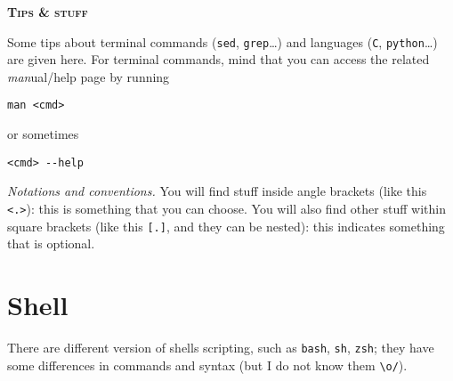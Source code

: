 \documentclass[a4paper,12pt,%
              final%
              ]{article}
\begin{document}
\begin{center}
\bfseries \scshape \Huge \color{BlueX}%
Tips \& stuff
\end{center}
%
\vspace*{\baselineskip}

Some tips about terminal commands (\texttt{sed}, \texttt{grep}\ldots) and languages (\texttt{C}, \texttt{python}\ldots) are given here. For terminal commands, mind that you can access the related \emph{man}ual/help page by running
\begin{verbatim}
man <cmd>
\end{verbatim}
or sometimes
\begin{verbatim}
<cmd> --help
\end{verbatim}

\emph{Notations and conventions.} You will find stuff inside angle brackets (like this \verb|<.>|): this is something that you can choose. You will also find other stuff within square brackets (like this \verb|[.]|, and they can be nested): this indicates something that is optional.

\section{Shell}
\label{sec:shell}
There are different version of shells scripting, such as \texttt{bash}, \texttt{sh}, \texttt{zsh}; they have some differences in commands and syntax (but I do not know them \verb|\o/|).
\end{document}
